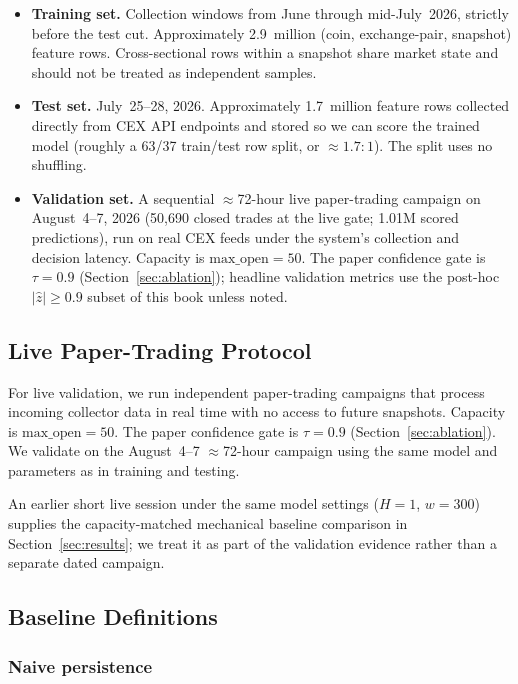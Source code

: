 \begin{itemize}
    \item \textbf{Training set.} Collection windows from June through mid-July~2026, strictly before the test cut. Approximately 2.9~million (coin, exchange-pair, snapshot) feature rows. Cross-sectional rows within a snapshot share market state and should not be treated as independent samples.
    \item \textbf{Test set.} July~25--28, 2026. Approximately 1.7~million feature rows collected directly from CEX API endpoints and stored so we can score the trained model (roughly a 63/37 train/test row split, or ${\approx}1.7{:}1$). The split uses no shuffling.
    \item \textbf{Validation set.} A sequential ${\approx}$72-hour live paper-trading campaign on August~4--7, 2026 (50{,}690 closed trades at the live gate; 1.01M scored predictions), run on real CEX feeds under the system's collection and decision latency. Capacity is $\text{max\_open} = 50$. The paper confidence gate is $\tau{=}0.9$ (Section~\ref{sec:ablation}); headline validation metrics use the post-hoc $|\hat{z}|\geq 0.9$ subset of this book unless noted.
\end{itemize}

\subsection{Live Paper-Trading Protocol}

For live validation, we run independent paper-trading campaigns that process incoming collector data in real time with no access to future snapshots. Capacity is $\text{max\_open} = 50$. The paper confidence gate is $\tau{=}0.9$ (Section~\ref{sec:ablation}). We validate on the August~4--7 ${\approx}$72-hour campaign using the same model and parameters as in training and testing.

An earlier short live session under the same model settings ($H{=}1$, $w{=}300$) supplies the capacity-matched mechanical baseline comparison in Section~\ref{sec:results}; we treat it as part of the validation evidence rather than a separate dated campaign.

\subsection{Baseline Definitions}

\subsubsection{Naive persistence}

